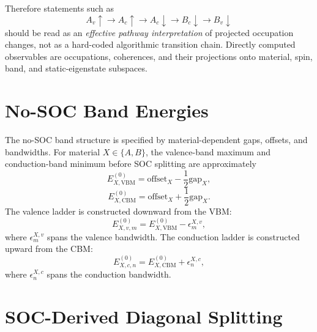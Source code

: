 \documentclass[11pt,a4paper]{article}
\begin{document}
Therefore statements such as
\begin{equation}
A_v\uparrow\rightarrow A_c\uparrow\rightarrow A_c\downarrow\rightarrow B_c\downarrow\rightarrow B_v\downarrow
\end{equation}
should be read as an \emph{effective pathway interpretation} of projected occupation changes, 
not as a hard-coded algorithmic transition chain.  
Directly computed observables are occupations, coherences, and their projections onto material, 
spin, band, and static-eigenstate subspaces.

\section{No-SOC Band Energies}

The no-SOC band structure is specified by material-dependent gaps, offsets, and bandwidths.  For material $X\in\{A,B\}$, the valence-band maximum and conduction-band minimum before SOC splitting are approximately
\begin{equation}
E^{(0)}_{X,\mathrm{VBM}} = \mathrm{offset}_X - \frac{1}{2}\mathrm{gap}_X,
\end{equation}
\begin{equation}
E^{(0)}_{X,\mathrm{CBM}} = \mathrm{offset}_X + \frac{1}{2}\mathrm{gap}_X.
\end{equation}
The valence ladder is constructed downward from the VBM:
\begin{equation}
E^{(0)}_{X,v,m}=E^{(0)}_{X,\mathrm{VBM}}-\epsilon^{X,v}_m,
\end{equation}
where $\epsilon^{X,v}_m$ spans the valence bandwidth.  The conduction ladder is constructed upward from the CBM:
\begin{equation}
E^{(0)}_{X,c,n}=E^{(0)}_{X,\mathrm{CBM}}+\epsilon^{X,c}_n,
\end{equation}
where $\epsilon^{X,c}_n$ spans the conduction bandwidth.

\section{SOC-Derived Diagonal Splitting}
\end{document}
